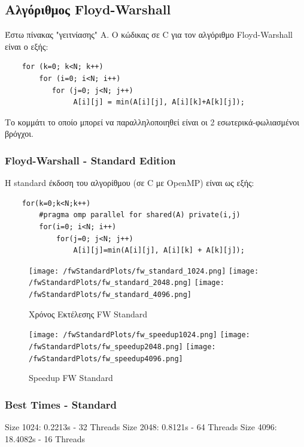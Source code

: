 \documentclass[../final_report.tex]{subfiles}
\begin{document}
\subsection{Αλγόριθμος Floyd-Warshall}

Έστω πίνακας "γειτνίασης" Α. Ο κώδικας σε C για τον αλγόριθμο Floyd-Warshall είναι ο εξής:

\begin{lstlisting}
    for (k=0; k<N; k++)
        for (i=0; i<N; i++)
           for (j=0; j<N; j++)
                A[i][j] = min(A[i][j], A[i][k]+A[k][j]);
\end{lstlisting}

Το κομμάτι το οποίο μπορεί να παραλληλοποιηθεί είναι οι 2 εσωτερικά-φωλιασμένοι βρόγχοι.

\subsubsection{Floyd-Warshall - Standard Edition}
Η standard έκδοση του αλγορίθμου (σε C με OpenMP) είναι ως εξής:

\begin{lstlisting}
    for(k=0;k<N;k++)
        #pragma omp parallel for shared(A) private(i,j)
        for(i=0; i<N; i++)
            for(j=0; j<N; j++)
                A[i][j]=min(A[i][j], A[i][k] + A[k][j]);
\end{lstlisting}

\begin{figure}[H]
    \centering
    \texttt{[image: /fwStandardPlots/fw\_standard\_1024.png]}
    \texttt{[image: /fwStandardPlots/fw\_standard\_2048.png]}
    \texttt{[image: /fwStandardPlots/fw\_standard\_4096.png]}
    \caption{Χρόνος Εκτέλεσης FW Standard}
    \label{fig:Χρόνος Εκτέλεσης FW Standard}
\end{figure}

\begin{figure}[H]
    \centering
    \texttt{[image: /fwStandardPlots/fw\_speedup1024.png]}
    \texttt{[image: /fwStandardPlots/fw\_speedup2048.png]}
    \texttt{[image: /fwStandardPlots/fw\_speedup4096.png]}
    \caption{Speedup FW Standard}
    \label{fig:Speedup FW Standard}
\end{figure}

\subsubsection*{Best Times - Standard}
Size 1024: 0.2213s - 32 Threads
\newline
Size 2048: 0.8121s - 64 Threads
\newline
Size 4096: 18.4082s - 16 Threads
\newline
\end{document}
